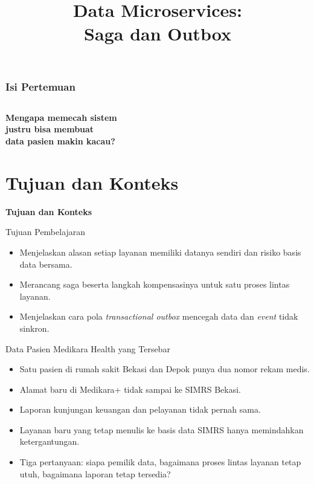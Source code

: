\documentclass[aspectratio=169, table, 12pt]{beamer}
\title{\Huge Data Microservices:\\ \vspace{10pt} Saga dan Outbox}
\begin{document}
\frame{\titlepage}

\begin{frame}
  \frametitle{Isi Pertemuan}
  \vspace{14pt}
  \begin{columns}[t]
    {\small\tableofcontents[sections={1-4}]}

    {\small\tableofcontents[sections={5-8}]}
  \end{columns}
\end{frame}

\begin{frame}{\hfill}
  \centering
  \Huge{\textbf{Mengapa memecah sistem\\justru bisa membuat\\data pasien makin kacau?}}
\end{frame}

\section{Tujuan dan Konteks}

\begin{frame}{\hfill}
  \centering
  \Huge{\textbf{Tujuan dan Konteks}}
\end{frame}

\begin{frame}{{\Large Tujuan Pembelajaran}}
  \vspace{10pt}
  \begin{itemize}
    \item Menjelaskan alasan setiap layanan memiliki datanya sendiri dan risiko
          basis data bersama.
    \item Merancang saga beserta langkah kompensasinya untuk satu proses
          lintas layanan.
    \item Menjelaskan cara pola \textit{transactional outbox} mencegah data dan
          \textit{event} tidak sinkron.
  \end{itemize}
\end{frame}

\begin{frame}{{\Large Data Pasien Medikara Health yang Tersebar}}
  \vspace{6pt}
  \small
  \begin{itemize}
    \item Satu pasien di rumah sakit Bekasi dan Depok punya dua nomor rekam
          medis.
    \item Alamat baru di Medikara+ tidak sampai ke SIMRS Bekasi.
    \item Laporan kunjungan keuangan dan pelayanan tidak pernah sama.
    \item Layanan baru yang tetap menulis ke basis data SIMRS hanya memindahkan
          ketergantungan.
    \item Tiga pertanyaan: siapa pemilik data, bagaimana proses lintas layanan
          tetap utuh, bagaimana laporan tetap tersedia?
  \end{itemize}
\end{frame}
\end{document}
